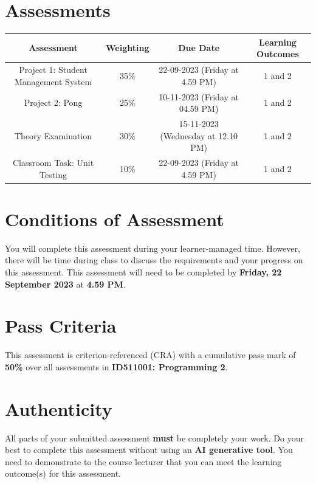 \documentclass{article}
\begin{document}
\section*{Assessments}
\renewcommand{\arraystretch}{1.5}
\begin{tabular}{|c|c|c|c|}
	\hline
	\textbf{Assessment}                                 & \textbf{Weighting} & \textbf{Due Date}            & \textbf{Learning Outcomes} \\ \hline
	\small Project 1: Student Management System  & \small 35\%        & \small 22-09-2023 (Friday at 4.59 PM)   & \small 1 and 2                   \\ \hline
	\small Project 2: Pong & \small 25\%        & \small 10-11-2023 (Friday at 04.59 PM)  & \small 1 and 2                   \\ \hline
	\small Theory Examination                        & \small 30\%        & \small 15-11-2023 (Wednesday at 12.10 PM)  & \small 1 and 2                   \\ \hline
	\small Classroom Task: Unit Testing                       & \small 10\%        & \small 22-09-2023 (Friday at 4.59 PM)  & \small 1 and 2                   \\ \hline
\end{tabular} 

\section*{Conditions of Assessment}
You will complete this assessment during your learner-managed time. However, there will be time during class to discuss the requirements and your progress on this assessment. This assessment will need to be completed by \textbf{Friday, 22 September 2023} at \textbf{4.59 PM}.

\section*{Pass Criteria}
This assessment is criterion-referenced (CRA) with a cumulative pass mark of \textbf{50\%} over all assessments in \textbf{ID511001: Programming 2}.

\section*{Authenticity}
All parts of your submitted assessment \textbf{must} be completely your work. Do your best to complete this assessment without using an \textbf{AI generative tool}. You need to demonstrate to the course lecturer that you can meet the learning outcome(s) for this assessment. \\
 
\end{document}
